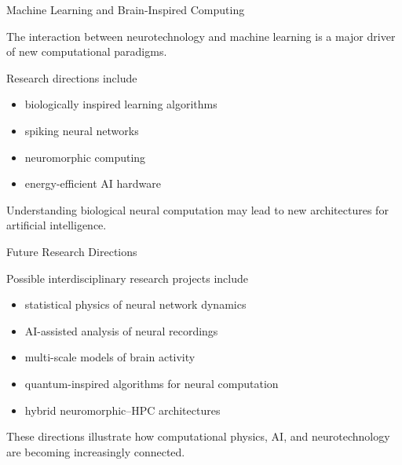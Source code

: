 \documentclass{beamer}
\begin{document}

\begin{frame}{Machine Learning and Brain-Inspired Computing}

The interaction between neurotechnology and machine learning is
a major driver of new computational paradigms.

Research directions include

\begin{itemize}
\item biologically inspired learning algorithms
\item spiking neural networks
\item neuromorphic computing
\item energy-efficient AI hardware
\end{itemize}

Understanding biological neural computation may lead to
new architectures for artificial intelligence.

\end{frame}


\begin{frame}{Future Research Directions}

Possible interdisciplinary research projects include

\begin{itemize}
\item statistical physics of neural network dynamics
\item AI-assisted analysis of neural recordings
\item multi-scale models of brain activity
\item quantum-inspired algorithms for neural computation
\item hybrid neuromorphic–HPC architectures
\end{itemize}

These directions illustrate how computational physics,
AI, and neurotechnology are becoming increasingly connected.

\end{frame}

\end{document}
